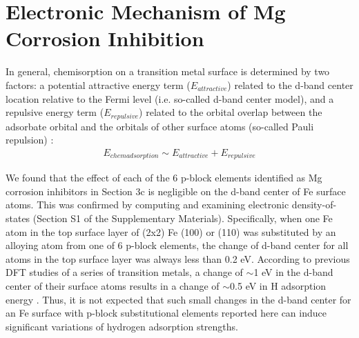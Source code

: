 \endgroup

\section{Electronic Mechanism of Mg Corrosion Inhibition}

In general, chemisorption on a transition metal surface is determined by two factors: a potential attractive energy term ($E_{attractive}$) related to the d-band center location relative to the Fermi level (i.e. so-called d-band center model), and a repulsive energy term ($E_{repulsive}$) related to the orbital overlap between the adsorbate orbital and the orbitals of other surface atoms (so-called Pauli repulsion) \cite{hammer1995electronic,hammer1995gold}:
\begin{align}
E_{chem adsorption} \sim E_{attractive} + E_{repulsive}
\label{Chap:Mg_H:eq:electronic}
\end{align}

We found that the effect of each of the 6 p-block elements identified as Mg corrosion inhibitors in Section 3c is negligible on the d-band center of Fe surface atoms. This was confirmed by computing and examining electronic density-of-states (Section S1 of the Supplementary Materials). Specifically, when one Fe atom in the top surface layer of (2x2) Fe (100) or (110) was substituted by an alloying atom from one of 6 p-block elements, the change of d-band center for all atoms in the top surface layer was always less than 0.2 eV. According to previous DFT studies of a series of transition metals, a change of $\sim$1 eV in the d-band center of their surface atoms results in a change of $\sim$0.5 eV in H adsorption energy \cite{greeley2006computational}. Thus, it is not expected that such small changes in the d-band center for an Fe surface with p-block substitutional elements reported here can induce significant variations of hydrogen adsorption strengths.

